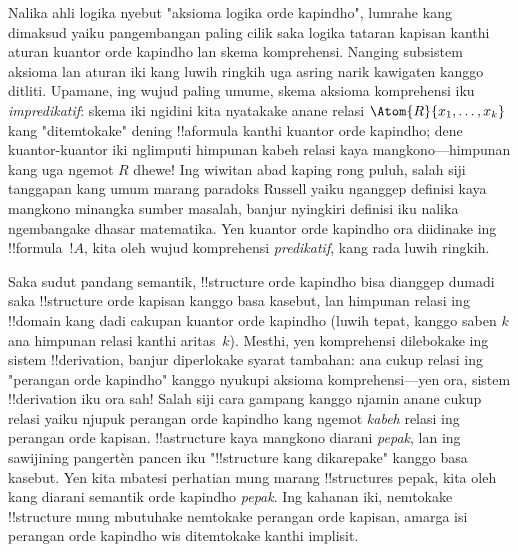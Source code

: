\documentclass[../../../include/open-logic-section]{subfiles}
\begin{document}
Nalika ahli logika nyebut "aksioma logika
orde kapindho", lumrahe kang dimaksud
yaiku pangembangan paling cilik saka
logika tataran kapisan kanthi aturan kuantor
orde kapindho lan skema komprehensi.
Nanging subsistem aksioma lan aturan iki
kang luwih ringkih uga asring narik
kawigaten kanggo ditliti. Upamane,
ing wujud paling umume, skema aksioma
komprehensi iku \emph{impredikatif}:
skema iki ngidini kita nyatakake anane
relasi $\Atom{R}{x_1, \dots, x_k}$
kang "ditemtokake" dening !!a{formula}
kanthi kuantor orde kapindho; dene
kuantor-kuantor iki nglimputi himpunan
kabeh relasi kaya mangkono---himpunan
kang uga ngemot $R$ dhewe!{}
Ing wiwitan abad kaping rong puluh,
salah siji tanggapan kang umum marang
paradoks Russell yaiku nganggep
definisi kaya mangkono minangka
sumber masalah, banjur nyingkiri
definisi iku nalika ngembangake
dhasar matematika. Yen kuantor
orde kapindho ora diidinake ing
!!{formula}~$!A$, kita oleh
wujud komprehensi {\em predikatif},
kang rada luwih ringkih.

Saka sudut pandang semantik,
!!{structure} orde kapindho bisa
dianggep dumadi saka !!{structure}
orde kapisan kanggo basa kasebut,
lan himpunan relasi ing !!{domain}
kang dadi cakupan kuantor orde
kapindho (luwih tepat, kanggo
saben $k$ ana himpunan relasi
kanthi aritas~$k$). Mesthi,
yen komprehensi dilebokake ing
sistem !!{derivation}, banjur
diperlokake syarat tambahan:
ana cukup relasi ing "perangan
orde kapindho" kanggo nyukupi
aksioma komprehensi---yen ora,
sistem !!{derivation} iku ora sah!{}
Salah siji cara gampang kanggo
njamin anane cukup relasi yaiku
njupuk perangan orde kapindho
kang ngemot \emph{kabeh} relasi
ing perangan orde kapisan.
!!a{structure} kaya mangkono
diarani \emph{pepak}, lan ing
sawijining pangertèn pancen
iku "!!{structure} kang dikarepake"
kanggo basa kasebut. Yen kita
mbatesi perhatian mung marang
!!{structure}s pepak, kita
oleh kang diarani semantik
orde kapindho \emph{pepak}.
Ing kahanan iki, nemtokake
!!{structure} mung mbutuhake
nemtokake perangan orde kapisan,
amarga isi perangan orde kapindho
wis ditemtokake kanthi implisit.
\end{document}
